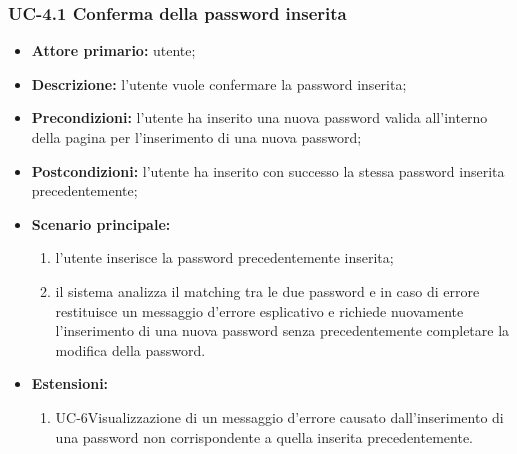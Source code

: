 \subsubsection{UC-4.1 Conferma della password inserita}
\begin{itemize}
	\item \textbf{Attore primario:} utente;

	\item \textbf{Descrizione:} l'utente vuole confermare la password inserita;

	\item \textbf{Precondizioni:} l'utente ha inserito una nuova password valida all'interno della pagina per l'inserimento di una nuova password;

	\item \textbf{Postcondizioni:} l'utente ha inserito con successo la stessa password inserita precedentemente;

	\item \textbf{Scenario principale:}
	\begin{enumerate}
    	\item l'utente inserisce la password precedentemente inserita;
   	    \item il sistema analizza il matching tra le due password e in caso di errore restituisce un messaggio d'errore esplicativo e richiede nuovamente l'inserimento di una nuova password senza precedentemente completare la modifica della password.
\end{enumerate}
	\item \textbf{Estensioni:}
	\begin{enumerate}
    	\item UC-6Visualizzazione di un messaggio d'errore causato dall'inserimento di una password non corrispondente a quella inserita precedentemente. 
	\end{enumerate}
\end{itemize}
